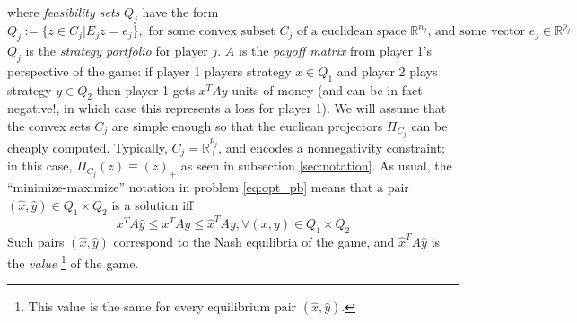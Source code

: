\documentclass[a4paper,9pt,journal]{IEEEtran}
\begin{document}
where \textit{feasibility sets} $Q_j$ have the form
\begin{equation}
  Q_j := \{z \in C_j|E_jz = e_j\},\text{ for some convex subset $C_j$ of a euclidean space $\mathbb{R}^{n_j}$, and some vector $e_j \in \mathbb{R}^{p_j}$}
\end{equation}
$Q_j$ is the \textit{strategy portfolio} for player $j$. $A$ is the \textit{payoff matrix} from player 1's perspective of the game: if player 1 players strategy
$x \in Q_1$ and player 2 plays strategy $y \in Q_2$ then player 1 gets $x^TAy$ units of money (and can be in fact negative!, in which case this represents a loss for player 1).
We will assume that the convex sets $C_j$ are simple enough so that the eucliean projectors $\Pi_{C_j}$ can be cheaply computed.
Typically, $C_j = \mathbb{R}^{p_j}_+$, and encodes a nonnegativity constraint; in this case, $\Pi_{C_j}(z) \equiv (z)_+$ as seen in subsection \ref{sec:notation}.
As usual, the ``minimize-maximize'' notation in problem \eqref{eq:opt_pb} means that a pair $(\hat{x}, \hat{y}) \in Q_1 \times Q_2$ is a solution iff
\begin{equation}
  x^TA\hat{y} \le x^TAy \le {\hat{x}}^TAy, \forall (x, y) \in Q_1 \times Q_2
\end{equation}
Such pairs $(\hat{x}, \hat{y})$ correspond to the Nash equilibria of the game, and ${\hat{x}}^TA\hat{y}$ is the \textit{value}
\footnote{This value is the same for every equilibrium pair $(\hat{x}, \hat{y})$.} of the game.
\end{document}
